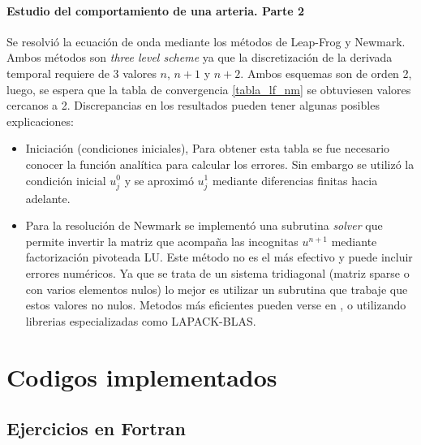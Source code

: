 \documentclass[letterpaper]{article}
\begin{document}
\paragraph{Estudio del comportamiento de una arteria. Parte 2} 
Se resolvió la ecuación de onda mediante los métodos de Leap-Frog y Newmark. Ambos métodos son \textit{three level scheme} ya que la discretización de la derivada temporal requiere de 3 valores $n$, $n+1$ y $n+2$. Ambos esquemas son de orden 2, luego, se espera que la tabla de convergencia \ref{tabla_lf_nm} se obtuviesen valores cercanos a 2. Discrepancias en los resultados pueden tener algunas posibles explicaciones:
\begin{itemize}
\item Iniciación (condiciones iniciales), Para obtener esta tabla se fue necesario conocer la función analítica para calcular los errores. Sin embargo se utilizó la condición inicial $u^0_j$ y se aproximó $u^1_j$ mediante diferencias finitas hacia adelante.
\item Para la resolución de Newmark se implementó una subrutina \textit{solver} que permite invertir la matriz que acompaña las incognitas $u^{n+1}$ mediante factorización pivoteada LU. Este método no es el más efectivo y puede incluir errores numéricos. Ya que se trata de un sistema tridiagonal (matriz sparse o con varios elementos nulos) lo mejor es utilizar un subrutina que trabaje que estos valores no nulos. Metodos más eficientes pueden verse en \cite{inv}, o utilizando librerias especializadas como LAPACK-BLAS.
\end{itemize}


\newpage

\section{Codigos implementados}
\subsection{Ejercicios en Fortran}
\end{document}
